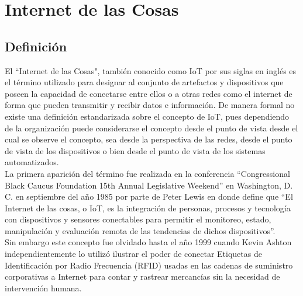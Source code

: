 

\chapter{Internet de las Cosas}
\section{Definición}
El ``Internet de las Cosas", también conocido como IoT por sus siglas en inglés es el término utilizado para designar al conjunto de artefactos y dispositivos que poseen la capacidad de conectarse entre ellos o a otras redes como el internet de forma que pueden transmitir y recibir datos e información. De manera formal no existe una definición estandarizada sobre el concepto de IoT, pues dependiendo de la organización puede considerarse el concepto desde el punto de vista desde el cual se observe el concepto, sea desde la perspectiva de las redes, desde el punto de vista de los dispositivos o bien desde el punto de vista de los sistemas automatizados.\\

La primera aparición del término fue realizada en la conferencia ``Congressional Black Caucus Foundation 15th Annual Legislative Weekend'' en Washington, D. C. en septiembre del año 1985 por parte de Peter Lewis \cite{IoTTrueHistory} en donde define que ``El Internet de las cosas, o IoT, es la integración de personas, procesos y tecnología con dispositivos y sensores conectables para permitir el monitoreo, estado, manipulación y evaluación remota de las tendencias de dichos dispositivos''\cite{IoTFirstDef}.\\

Sin embargo este concepto fue olvidado hasta el año 1999 cuando Kevin Ashton independientemente lo utilizó ilustrar el poder de conectar Etiquetas de Identificación por Radio Frecuencia (RFID) usadas en las cadenas de suministro corporativas a Internet para contar y rastrear mercancías sin la necesidad de intervención humana\cite{iotInternetSociety}.\\

